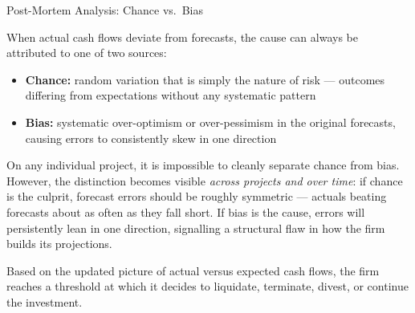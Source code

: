 \documentclass[10pt]{article}
\begin{document}
    \begin{core}{Post-Mortem Analysis: Chance vs.\ Bias}

      When actual cash flows deviate from forecasts, the cause can always be attributed to one of two sources:

      \begin{itemize}

        \item \textbf{Chance:} random variation that is simply the nature of risk — outcomes differing from expectations without any systematic pattern

        \item \textbf{Bias:} systematic over-optimism or over-pessimism in the original forecasts, causing errors to consistently skew in one direction

      \end{itemize}

      On any individual project, it is impossible to cleanly separate chance from bias. However, the distinction becomes visible \textit{across projects and over time}: if chance is the culprit, forecast errors should be roughly symmetric — actuals beating forecasts about as often as they fall short. If bias is the cause, errors will persistently lean in one direction, signalling a structural flaw in how the firm builds its projections.

      Based on the updated picture of actual versus expected cash flows, the firm reaches a threshold at which it decides to liquidate, terminate, divest, or continue the investment.


    \end{core}
\end{document}
